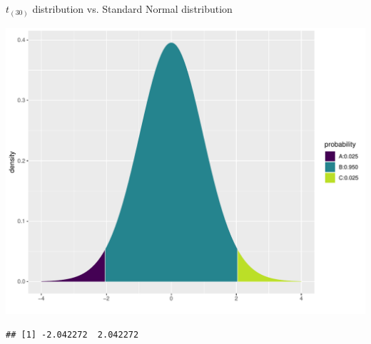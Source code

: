 \documentclass{beamer}\usepackage[]{graphicx}\usepackage[]{color}
\newenvironment{knitrout}{}{} %
\begin{document}
\begin{frame}[fragile]{$t_{(30)}$ distribution vs. Standard Normal distribution}
\begin{minipage}{0.5\textwidth}
\begin{knitrout}
\end{knitrout}
\begin{knitrout}\scriptsize
{}\color{fgcolor}

{\centering \includegraphics[width=1\linewidth]{figure/unnamed-chunk-7-1} 

}


\begin{verbatim}
## [1] -2.042272  2.042272
\end{verbatim}

\end{knitrout}
\end{minipage}
\end{frame}

\end{document}

